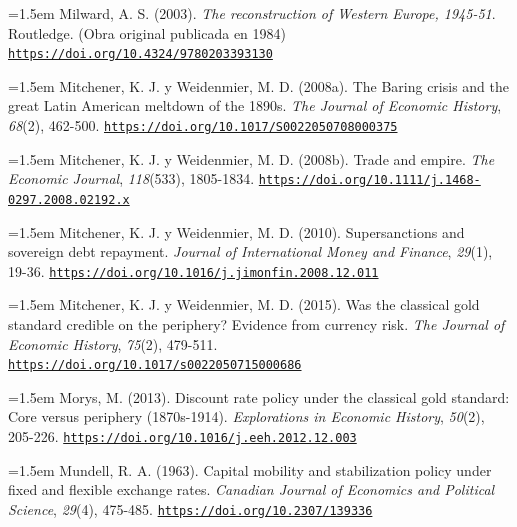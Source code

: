 \documentclass[10pt,a4paper]{article}
\begin{document}
{\sloppy\noindent\hangindent=1.5em Milward, A. S. (2003). \textit{The reconstruction of Western Europe, 1945-51}. Routledge. (Obra original publicada en 1984) \href{https://doi.org/10.4324/9780203393130}{\nolinkurl{https://doi.org/10.4324/9780203393130}}\par}

{\sloppy\noindent\hangindent=1.5em Mitchener, K. J. y Weidenmier, M. D. (2008a). The Baring crisis and the great Latin American meltdown of the 1890s. \textit{The Journal of Economic History}, \textit{68}(2), 462-500. \href{https://doi.org/10.1017/S0022050708000375}{\nolinkurl{https://doi.org/10.1017/S0022050708000375}}\par}

{\sloppy\noindent\hangindent=1.5em Mitchener, K. J. y Weidenmier, M. D. (2008b). Trade and empire. \textit{The Economic Journal}, \textit{118}(533), 1805-1834. \href{https://doi.org/10.1111/j.1468-0297.2008.02192.x}{\nolinkurl{https://doi.org/10.1111/j.1468-0297.2008.02192.x}}\par}

{\sloppy\noindent\hangindent=1.5em Mitchener, K. J. y Weidenmier, M. D. (2010). Supersanctions and sovereign debt repayment. \textit{Journal of International Money and Finance}, \textit{29}(1), 19-36. \href{https://doi.org/10.1016/j.jimonfin.2008.12.011}{\nolinkurl{https://doi.org/10.1016/j.jimonfin.2008.12.011}}\par}

{\sloppy\noindent\hangindent=1.5em Mitchener, K. J. y Weidenmier, M. D. (2015). Was the classical gold standard credible on the periphery? Evidence from currency risk. \textit{The Journal of Economic History}, \textit{75}(2), 479-511. \href{https://doi.org/10.1017/s0022050715000686}{\nolinkurl{https://doi.org/10.1017/s0022050715000686}}\par}

{\sloppy\noindent\hangindent=1.5em Morys, M. (2013). Discount rate policy under the classical gold standard: Core versus periphery (1870s-1914). \textit{Explorations in Economic History}, \textit{50}(2), 205-226. \href{https://doi.org/10.1016/j.eeh.2012.12.003}{\nolinkurl{https://doi.org/10.1016/j.eeh.2012.12.003}}\par}

{\sloppy\noindent\hangindent=1.5em Mundell, R. A. (1963). Capital mobility and stabilization policy under fixed and flexible exchange rates. \textit{Canadian Journal of Economics and Political Science}, \textit{29}(4), 475-485. \href{https://doi.org/10.2307/139336}{\nolinkurl{https://doi.org/10.2307/139336}}\par}
\end{document}
